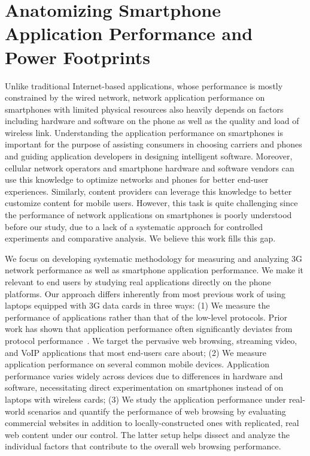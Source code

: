 \chapter{Anatomizing Smartphone Application Performance and Power Footprints} \label{chap:app}

Unlike traditional Internet-based applications, whose performance is mostly constrained by the wired network, network application performance on smartphones with limited physical resources also heavily depends on factors including hardware and software on the 
phone as well as the quality and load of wireless link. Understanding 
the application performance on smartphones is important for the 
purpose of assisting consumers in choosing carriers and phones and 
guiding application developers in designing intelligent software. 
Moreover, cellular network operators and smartphone hardware and 
software vendors can use this knowledge to optimize networks and 
phones for better end-user experiences. Similarly, content providers 
can leverage this knowledge to better customize content for mobile 
users. However, this task is quite challenging since the performance 
of network applications on smartphones is poorly understood before our study, due to a lack of a systematic approach for controlled experiments 
and comparative analysis. We believe this work fills this gap.

We focus on developing systematic methodology for measuring and
analyzing 3G network performance as well as smartphone application
performance. We make it relevant to end users by studying real
applications directly on the phone platforms. Our approach differs 
inherently from most previous work of using laptops equipped with 
3G data cards in three ways: (1) We measure the performance of 
applications rather than that of the low-level protocols. Prior 
work has shown that application performance often significantly 
deviates from protocol performance~\cite{Zhuang:A3:Mobicom2006}. 
We target the pervasive web browsing, streaming video, and VoIP
applications that most end-users care about; (2) We measure 
application performance on several common mobile devices. 
Application performance varies widely across devices due to 
differences in hardware and software, necessitating direct 
experimentation on smartphones instead of on laptops with wireless 
cards; (3) We study the application performance under real-world 
scenarios and quantify the performance of web browsing by 
evaluating commercial websites in addition to locally-constructed 
ones with replicated, real web content under our control. The 
latter setup helps dissect and analyze the individual factors 
that contribute to the overall web browsing performance.

